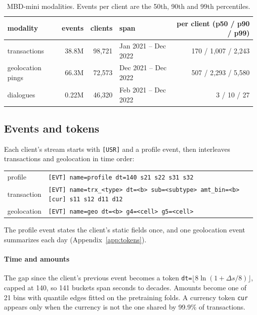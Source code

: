 \documentclass[12pt]{article}
\newcommand{\tok}[1]{\texttt{#1}}
\begin{document}
\begin{table}[htbp]
\centering
\caption{MBD-mini modalities. Events per client are the 50th, 90th and 99th percentiles.}
\label{tab:mbd}
\begin{tabular}{lrrlr}
\toprule
modality & events & clients & span & per client (p50 / p90 / p99) \\
\midrule
transactions & 38.8M & 98,721 & Jan 2021 -- Dec 2022 & 170 / 1,007 / 2,243 \\
geolocation pings & 66.3M & 72,573 & Dec 2021 -- Dec 2022 & 507 / 2,293 / 5,580 \\
dialogues & 0.22M & 46,320 & Feb 2021 -- Dec 2022 & 3 / 10 / 27 \\
\bottomrule
\end{tabular}
\end{table}

\subsection{Events and tokens}

Each client's stream starts with \tok{[USR]} and a profile event, then interleaves transactions and
geolocation in time order:
\begin{center}
\footnotesize
\setlength{\tabcolsep}{4pt}
\begin{tabular}{ll}
profile & \tok{[EVT] name=profile dt=140 s21 s22 s31 s32} \\
transaction & \tok{[EVT] name=trx\_<type> dt=<b> sub=<subtype> amt\_bin=<b> [cur] s11 s12 d11 d12} \\
geolocation & \tok{[EVT] name=geo dt=<b> g4=<cell> g5=<cell>} \\
\end{tabular}
\end{center}

The profile event states the client's static fields once, and one geolocation event summarizes each day (Appendix~\ref{app:tokens}).

\paragraph{Time and amounts} The gap since the client's previous event becomes a token
\tok{dt=}$\lfloor 8 \ln(1 + \Delta s/8) \rfloor$, capped at 140, so 141 buckets span seconds to
decades. Amounts become one of 21 bins with quantile edges fitted on the pretraining folds. A currency token \tok{cur} appears only when the currency is not the one shared by 99.9\% of transactions.
\end{document}
